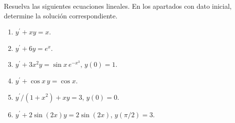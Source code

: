 Resuelva las siguientes ecuaciones lineales. En los apartados con dato inicial, determine la solución correspondiente.

\begin{enumerate}[label=(\alph*),ref=\alph*,leftmargin=*]
\item $y^{\prime}+xy=x$.
\item $y^{\prime}+6y=e^x$.
\item $y^{\prime}+3x^2y=\sin x\,e^{-x^3}$, $y(0)=1$.
\item $y^{\prime}+\cos x\,y=\cos x$.
\item $y^{\prime}/(1+x^2)+xy=3$, $y(0)=0$.
\item $y^{\prime}+2\sin(2x)y=2\sin(2x)$, $y(\pi/2)=3$.
\end{enumerate}
